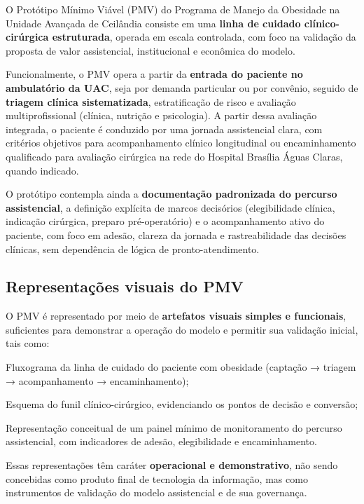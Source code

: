 \documentclass[12pt]{article}
\begin{document}
O Protótipo Mínimo Viável (PMV) do Programa de Manejo da Obesidade na Unidade Avançada de Ceilândia consiste em uma \textbf{\textbf{linha de cuidado clínico-cirúrgica estruturada}}, operada em escala controlada, com foco na validação da proposta de valor assistencial, institucional e econômica do modelo.

Funcionalmente, o PMV opera a partir da \textbf{\textbf{entrada do paciente no ambulatório da UAC}}, seja por demanda particular ou por convênio, seguido de \textbf{\textbf{triagem clínica sistematizada}}, estratificação de risco e avaliação multiprofissional (clínica, nutrição e psicologia). A partir dessa avaliação integrada, o paciente é conduzido por uma jornada assistencial clara, com critérios objetivos para acompanhamento clínico longitudinal ou encaminhamento qualificado para avaliação cirúrgica na rede do Hospital Brasília Águas Claras, quando indicado.

O protótipo contempla ainda a \textbf{\textbf{documentação padronizada do percurso assistencial}}, a definição explícita de marcos decisórios (elegibilidade clínica, indicação cirúrgica, preparo pré-operatório) e o acompanhamento ativo do paciente, com foco em adesão, clareza da jornada e rastreabilidade das decisões clínicas, sem dependência de lógica de pronto-atendimento.

\subsection{Representações visuais do PMV}
\label{sec:orgc8ef331}

O PMV é representado por meio de \textbf{\textbf{artefatos visuais simples e funcionais}}, suficientes para demonstrar a operação do modelo e permitir sua validação inicial, tais como:
\begin{hleveltwo}
\item Fluxograma da linha de cuidado do paciente com obesidade (captação → triagem → acompanhamento → encaminhamento);
\item Esquema do funil clínico-cirúrgico, evidenciando os pontos de decisão e conversão;
\item Representação conceitual de um painel mínimo de monitoramento do percurso assistencial, com indicadores de adesão, elegibilidade e encaminhamento.
\end{hleveltwo}

Essas representações têm caráter \textbf{\textbf{operacional e demonstrativo}}, não sendo concebidas como produto final de tecnologia da informação, mas como instrumentos de validação do modelo assistencial e de sua governança.
\end{document}

